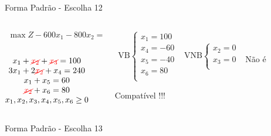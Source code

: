 \documentclass{beamer}
\begin{document}
\begin{frame}
{\begin{block}{Forma Padrão - {\color{cyan}Escolha 12}}
			\begin{columns}
				\begin{column}{0.35\textwidth}
					$
						\begin{matrix}
							\max Z - 600x_1 - 800x_2 = 0 \\
						\end{matrix}
					$ \\
					 \\
					$
						\begin{matrix}
							x_1  + {\color{red}\cancel{x_2}}  + {\color{red}\cancel{x_3}}                   = 100 \\
							3x_1 + 2{\color{red}\cancel{x_2}}       + x_4             = 240 \\
							x_1                     + x_5       = 60 \\
							{\color{red}\cancel{x_2}}                           + x_6 = 80 \\
							x_1,x_2, x_3, x_4, x_5, x_6 \ge 0 \\
						\end{matrix}
					$
				\end{column}
				\vline
				\hspace{0.1cm}
				\begin{column}{0.45\textwidth}
						$
							\begin{matrix}
								\text{VB} \left\{  \begin{matrix}
																 x_1 = 100 \\
																 x_4 = -60 \\
																 x_5 = -40 \\
																 x_6 = 80 \\
												   \end{matrix} 
										   \right.
								&
								\text{VNB} \left\{  \begin{matrix}
																 x_2 = 0 \\
																 x_3 = 0 \\
												   \end{matrix} 
										   \right. 
								\\
							 & \\
							\end{matrix}
						$
						{\color{red}Não é Compatível !!!}
				\end{column}
			\end{columns}
		\end{block}
	}
	{
		\begin{block}{Forma Padrão - {\color{cyan}Escolha 13}}

\end{block}}
\end{frame}
\end{document}
